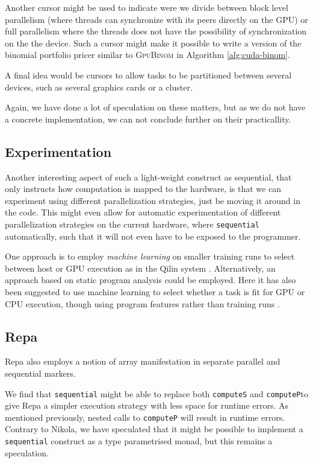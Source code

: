Another cursor might be used to indicate were we divide between block
level parallelism (where threads can synchronize with its peers
directly on the GPU) or full parallelism where the threads does not
have the possibility of synchronization on the the device. Such a
cursor might make it possible to write a version of the binomial
portfolio pricer similar to \textsc{GpuBinom} in Algorithm
\ref{alg:cuda-binom}.

A final idea would be cursors to allow tasks to be partitioned between
several devices, such as several graphics cards or a cluster.

Again, we have done a lot of speculation on these matters, but as we
do not have a concrete implementation, we can not conclude further on
their practicallity.



\subsection{Experimentation}
Another interesting aspect of such a light-weight construct as
sequential, that only instructs how computation is mapped to the
hardware, is that we can experiment using different parallelization
strategies, just be moving it around in the code. This might even
allow for automatic experimentation of different parallelization
strategies on the current hardware, where \lstinline{sequential} automatically, such that it will not
even have to be exposed to the programmer.

One approach is to employ \emph{machine learning} on smaller training
runs to select between host or GPU execution as in the Qilin system
\cite{luk2009qilin}. Alternatively, an approach based on static
program analysis could be employed. Here it has also been suggested to
use machine learning to select whether a task is fit for GPU or CPU
execution, though using program features rather than training runs
\cite{grewe2011static}.

\subsection{Repa}
Repa also employs a notion of array manifestation in separate parallel and
sequential markers.

We find that \lstinline{sequential} might be able to replace both
\lstinline{computeS} and \lstinline{computeP}to give Repa a simpler
execution strategy with less space for runtime errors. As mentioned
previously, nested calls to \lstinline{computeP} will result in
runtime errors. Contrary to Nikola, we have speculated that it might
be possible to implement a \lstinline{sequential} construct as a type
parametrised monad, but this remains a speculation.


